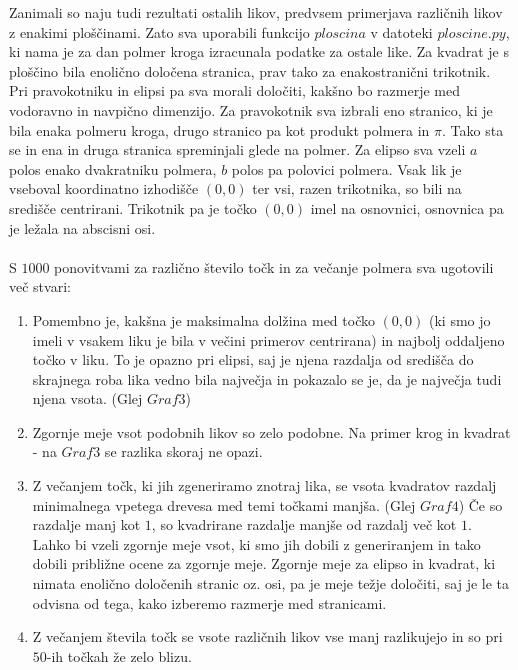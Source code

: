 \documentclass[a4paper]{report}
\begin{document}
Zanimali so naju tudi rezultati ostalih likov, predvsem primerjava različnih likov z enakimi ploščinami. Zato sva uporabili funkcijo $ploscina$ v datoteki \colorbox{gray!10}{$ploscine.py$}, ki nama je za dan polmer kroga izracunala podatke za ostale like.
Za kvadrat je s ploščino bila enolično določena stranica, prav tako za enakostranični trikotnik. Pri pravokotniku in elipsi pa sva morali določiti, kakšno bo razmerje med vodoravno in navpično dimenzijo. Za pravokotnik sva izbrali eno stranico, ki je bila enaka polmeru kroga, drugo stranico pa kot produkt polmera in $\pi$. Tako sta se in ena in druga stranica spreminjali glede na polmer.
Za elipso sva vzeli $a$ polos enako dvakratniku polmera, $b$ polos pa polovici polmera. 
Vsak lik je vseboval koordinatno izhodišče $(0,0)$ ter vsi, razen trikotnika, so bili na središče centrirani. Trikotnik pa je točko $(0,0)$ imel na osnovnici, osnovnica pa je ležala na abscisni osi. \\ \\
S $1000$ ponovitvami za različno število točk in za večanje polmera sva ugotovili več stvari:
\begin{enumerate} 
\item Pomembno je, kakšna je maksimalna dolžina med točko $(0,0)$ (ki smo jo imeli v vsakem liku je bila v večini primerov centrirana) in najbolj oddaljeno točko v liku. To je opazno pri elipsi, saj je njena razdalja od središča do skrajnega roba lika vedno bila največja in pokazalo se je, da je največja tudi njena vsota. (\small{Glej $Graf 3$})
\item Zgornje meje vsot podobnih likov so zelo podobne. Na primer krog in kvadrat - na \small{$Graf 3$} se razlika skoraj ne opazi. 
\item Z večanjem točk, ki jih zgeneriramo znotraj lika, se vsota kvadratov razdalj minimalnega vpetega drevesa med temi točkami manjša. (\small{Glej $Graf 4$}) Če so razdalje manj kot $1$, so kvadrirane razdalje manjše od razdalj več kot $1$. Lahko bi vzeli zgornje meje vsot, ki smo jih dobili z generiranjem in tako dobili približne ocene za zgornje meje. Zgornje meje za elipso in kvadrat, ki nimata enolično določenih stranic oz. osi, pa je meje težje določiti, saj je le ta odvisna od tega, kako izberemo razmerje med stranicami.
\item Z večanjem števila točk se vsote različnih likov vse manj razlikujejo in so pri $50$-ih točkah že zelo blizu. 
\end{enumerate}
\end{document}
